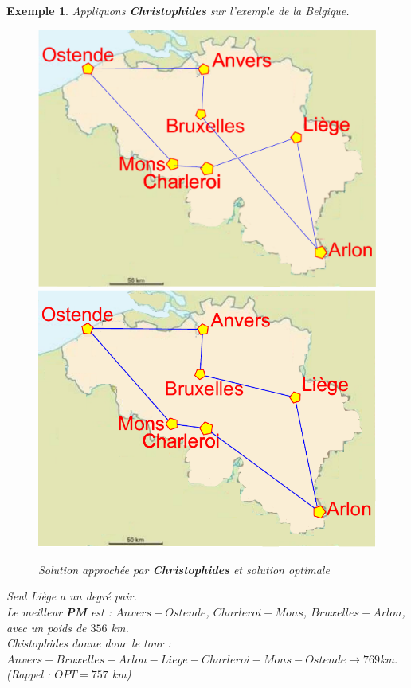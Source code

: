 \documentclass{article}
\newtheorem{exemple}{Exemple}[section]
\begin{document}
\begin{sffamily}
\begin{exemple} Appliquons \textbf{Christophides} sur l'exemple de la Belgique. \\
\begin{figure}[h!]
    \begin{center}
    \includegraphics[scale=0.28]{belgiqueCHRIS.pdf}
    \includegraphics[scale=0.5]{belgiqueOPT.pdf}
    \caption{Solution approchée par \textbf{Christophides} et solution optimale}
    \end{center}
\end{figure}

\noindent Seul Liège a un degré pair. \\
Le meilleur \textbf{PM} est : $Anvers-Ostende$, $Charleroi-Mons$, $Bruxelles-Arlon$, avec un poids de $356$ km. \\
Chistophides donne donc le tour : \\ $Anvers-Bruxelles-Arlon-Liege-Charleroi-Mons-Ostende \rightarrow 769$km. \\
\textit{(Rappel : $OPT = 757$ km)}
\end{exemple}


\end{sffamily}
\end{document}
